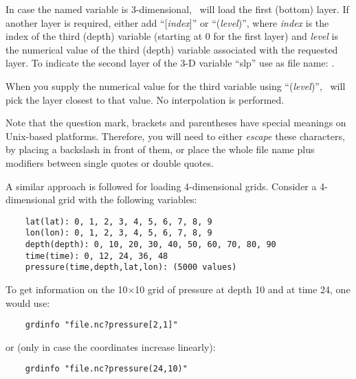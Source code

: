 In case the named variable is 3-dimensional, \GMT\ will load the first (bottom) layer. If another
layer is required, either add ``[\emph{index}]'' or ``(\emph{level})'', where \emph{index} is
the index of the third (depth) variable (starting at 0 for the first layer) and \emph{level}
is the numerical value of the third (depth) variable associated with the requested layer.
To indicate the second layer of the 3-D variable ``slp'' use as file name: .

When you supply the numerical value for the third variable using ``(\emph{level})'',
\GMT\ will pick the layer closest to that value. No interpolation is performed.

Note that the question mark, brackets and parentheses have special meanings on Unix-based platforms. Therefore,
you will need to either \emph{escape} these characters, by placing a backslash in front of them, or place the
whole file name plus modifiers between single quotes or double quotes.

A similar approach is followed for loading 4-dimensional grids. Consider a 4-dimensional grid with the following
variables:
\begin{verbatim}
	lat(lat): 0, 1, 2, 3, 4, 5, 6, 7, 8, 9
	lon(lon): 0, 1, 2, 3, 4, 5, 6, 7, 8, 9
	depth(depth): 0, 10, 20, 30, 40, 50, 60, 70, 80, 90
	time(time): 0, 12, 24, 36, 48
	pressure(time,depth,lat,lon): (5000 values)
\end{verbatim}
To get information on the 10$\times$10 grid of pressure at depth 10 and at time 24, one would use:
\begin{verbatim}
	grdinfo "file.nc?pressure[2,1]"
\end{verbatim}
or (only in case the coordinates increase linearly):
\begin{verbatim}
	grdinfo "file.nc?pressure(24,10)"
\end{verbatim}

